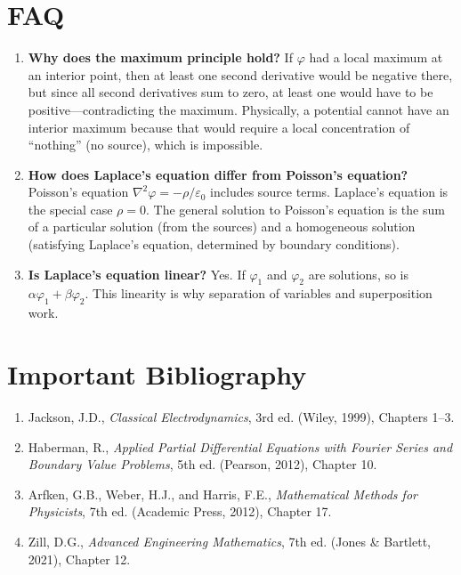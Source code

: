 \section*{FAQ}

\begin{enumerate}
\item \textbf{Why does the maximum principle hold?}
If $\varphi$ had a local maximum at an interior point, then at least one second derivative would be negative there, but since all second derivatives sum to zero, at least one would have to be positive---contradicting the maximum. Physically, a potential cannot have an interior maximum because that would require a local concentration of ``nothing'' (no source), which is impossible.

\item \textbf{How does Laplace's equation differ from Poisson's equation?}
Poisson's equation $\nabla^{2}\varphi = -\rho/\varepsilon_{0}$ includes source terms. Laplace's equation is the special case $\rho = 0$. The general solution to Poisson's equation is the sum of a particular solution (from the sources) and a homogeneous solution (satisfying Laplace's equation, determined by boundary conditions).

\item \textbf{Is Laplace's equation linear?}
Yes. If $\varphi_{1}$ and $\varphi_{2}$ are solutions, so is $\alpha\varphi_{1} + \beta\varphi_{2}$. This linearity is why separation of variables and superposition work.
\end{enumerate}
\section*{Important Bibliography}

\begin{enumerate}
\item Jackson, J.D., \textit{Classical Electrodynamics}, 3rd ed. (Wiley, 1999), Chapters 1--3.
\item Haberman, R., \textit{Applied Partial Differential Equations with Fourier Series and Boundary Value Problems}, 5th ed. (Pearson, 2012), Chapter 10.
\item Arfken, G.B., Weber, H.J., and Harris, F.E., \textit{Mathematical Methods for Physicists}, 7th ed. (Academic Press, 2012), Chapter 17.
\item Zill, D.G., \textit{Advanced Engineering Mathematics}, 7th ed. (Jones \& Bartlett, 2021), Chapter 12.
\end{enumerate}

